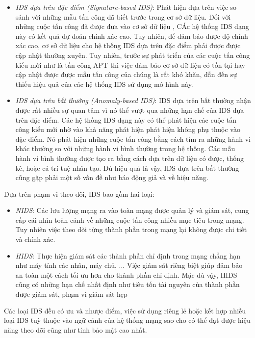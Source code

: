 \begin{itemize}
    \item \textit{IDS dựa trên đặc điểm (Signature-based IDS)}: Phát hiện dựa trên việc so sánh với những mẫu tấn công đã biết trước trong cơ sở dữ liệu. Đối với những cuộc tấn công đã được đưa vào cơ sở dữ liệu , CÁc hệ thống IDS dạng này có kết quả dự đoán chính xác cao. Tuy nhiên, để đảm bảo được độ chính xác cao, cơ sở dữ liệu cho hệ thống IDS dựa trên đặc điểm phải được được cập nhật thường xuyên. Tuy nhiên, trước sự phát triển của các cuộc tấn công kiểu mới như là tấn công APT thì việc đảm bảo cơ sở dữ liệu có tồn tại hay cập nhật được được mẫu tấn công của chúng là rất khó khăn, dẫn đến sự thiếu hiệu quả của các hệ thống IDS sử dụng mô hình này.
    \item \textit{IDS dựa trên bất thường (Anomaly-based IDS)}: IDS dựa trên bất thường nhận được rất nhiều sự quan tâm vì nó thể vượt qua những hạn chế của IDS dựa trên đặc điểm. Các hệ thống IDS dạng này có thể phát hiện các cuộc tấn công kiểu mới nhờ vào khả năng phát hiện phát hiện không phụ thuộc vào đặc điểm. Nó phát hiện những cuộc tấn công bằng cách tìm ra những hành vi khác thường so với những hành vi bình thường trong hệ thống. Các mẫu hành vi bình thường được tạo ra bằng cách dựa trên dữ liệu có được, thống kê, hoặc cả trí tuệ nhân tạo. Dù hiệu quả là vậy, IDS dựa trên bất thường cũng gặp phải một số vấn đề như báo động giả và về hiệu năng.
\end{itemize}

\bigbreak\noindent
Dựa trên phạm vi theo dõi, IDS bao gồm hai loại:

\begin{itemize}
    \item \textit{NIDS}: Các lưu lượng mạng ra vào toàn mạng được quản lý và giám sát, cung cấp cái nhìn toàn cảnh về những cuộc tấn công nhiều mục tiêu trong mạng. Tuy nhiên việc theo dõi từng thành phần trong mạng lại không được chi tiết và chính xác.
    \item \textit{HIDS}: Thực hiện giám sát các thành phần chỉ định trong mạng chẳng hạn như máy tính các nhân, máy chủ, ... Việc giám sát riêng biệt giúp đảm bảo an toàn một cách tối ưu hơn cho thành phần chỉ định. Mặc dù vậy, HIDS cũng có những hạn chế nhất định như tiêu tốn tài nguyên của thành phần được giám sát, phạm vi giám sát hẹp
\end{itemize}

\bigbreak\noindent
Các loại IDS đều có ưu và nhược điểm, việc sử dụng riêng lẻ hoặc kết hợp nhiều loại IDS tuỳ thuộc vào ngữ cảnh của hệ thống mạng sao cho có thể đạt được hiệu năng theo dõi cũng như tính bảo mật cao nhất.

